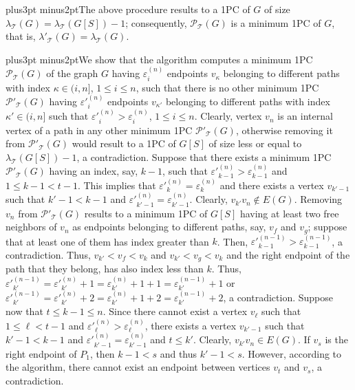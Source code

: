 \documentclass[10pt]{article}
\def\yskip{\penalty-50\vskip3pt plus3pt minus2pt}
\def\y{\yskip}
\begin{document}
{\y The above procedure results to a 1PC of $G$ of size
$\lambda_\mathcal{T}(G)=\lambda_\mathcal{T}(G[S])-1$;
consequently, $\mathcal{P_{\mathcal{T}}}(G)$ is a minimum 1PC of
$G$, that is, $\lambda'_\mathcal{T}(G)=\lambda_\mathcal{T}(G)$.

\y We show that the algorithm computes a minimum 1PC
$\mathcal{P_{\mathcal{T}}}(G)$ of the graph $G$ having
$\varepsilon^{(n)}_i$ endpoints $v_\kappa$ belonging to different
paths with index $\kappa \in (i,n]$, $1 \leq i \leq n$, such that
there is no other minimum 1PC $\mathcal{P'_{\mathcal{T}}}(G)$
having $\varepsilon'^{(n)}_i$ endpoints $v_{\kappa'}$ belonging to
different paths with index $\kappa' \in (i,n]$ such that
$\varepsilon'^{(n)}_i>\varepsilon^{(n)}_i$, $1 \leq i \leq n$.
Clearly, vertex $v_n$ is an internal vertex of a path in any other
minimum 1PC $\mathcal{P'_{\mathcal{T}}}(G)$, otherwise removing it
from $\mathcal{P'_{\mathcal{T}}}(G)$ would result to a 1PC of
$G[S]$ of size less or equal to $\lambda_\mathcal{T}(G[S])-1$, a
contradiction. Suppose that there exists a minimum 1PC
$\mathcal{P'_{\mathcal{T}}}(G)$ having an index, say, $k-1$, such
that $\varepsilon'^{(n)}_{k-1}>\varepsilon^{(n)}_{k-1}$ and $1
\leq k-1 < t-1$. This implies that
$\varepsilon'^{(n)}_k=\varepsilon^{(n)}_k$ and there exists a
vertex $v_{k'-1}$ such that $k'-1<k-1$ and
$\varepsilon'^{(n)}_{k'-1}=\varepsilon^{(n)}_{k'-1}$. Clearly,
$v_{k'}v_n \notin E(G)$. Removing $v_n$ from
$\mathcal{P'_{\mathcal{T}}}(G)$ results to a minimum 1PC of $G[S]$
having at least two free neighbors of $v_n$ as endpoints belonging
to different paths, say, $v_f$ and $v_g$; suppose that at least
one of them has index greater than $k$. Then,
$\varepsilon'^{(n-1)}_{k-1}>\varepsilon^{(n-1)}_{k-1}$, a
contradiction. Thus, $v_{k'}<v_f<v_k$ and $v_{k'}<v_g<v_k$ and the
right endpoint of the path that they belong, has also index less
than $k$. Thus,
$\varepsilon'^{(n-1)}_{k'}=\varepsilon'^{(n)}_{k'}+1=\varepsilon^{(n)}_{k'}+1+1=\varepsilon^{(n-1)}_{k'}+1$
or
$\varepsilon'^{(n-1)}_{k'}=\varepsilon'^{(n)}_{k'}+2=\varepsilon^{(n)}_{k'}+1+2=\varepsilon^{(n-1)}_{k'}+2$,
a contradiction. Suppose now that $t \leq k-1 \leq n$. Since there
cannot exist a vertex $v_\ell$ such that $1 \leq \ell < t-1$ and
$\varepsilon'^{(n)}_\ell>\varepsilon^{(n)}_\ell$, there exists a
vertex $v_{k'-1}$ such that $k'-1<k-1$ and
$\varepsilon'^{(n)}_{k'-1}=\varepsilon^{(n)}_{k'-1}$ and $t \leq
k'$. Clearly, $v_{k'}v_n \in E(G)$. If $v_s$ is the right endpoint
of $P_1$, then $k-1<s$ and thus $k'-1<s$. However, according to
the algorithm, there cannot exist an endpoint between vertices
$v_t$ and $v_s$, a contradiction.

}
\end{document}
